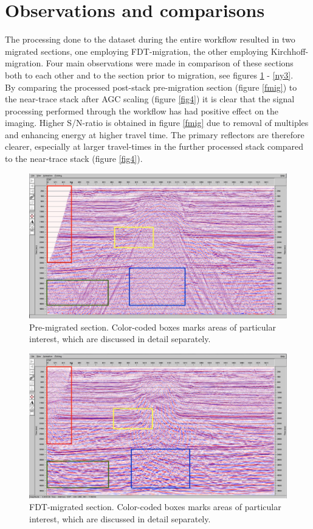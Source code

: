 \documentclass[10pt,a4paper]{article}
\begin{document}
\section{Observations and comparisons}

The processing done to the dataset during the entire workflow resulted in two migrated sections, one employing FDT-migration, the other employing Kirchhoff-migration. Four main observations were made in comparison of these sections both to each other and to the section prior to migration, see figures \ref{ny1} - \ref{ny3}.
\\
By comparing the processed post-stack pre-migration section (figure \ref{fmig}) to the near-trace stack after AGC scaling (figure \ref{fig4}) it is clear that the signal processing performed through the workflow has had positive effect on the imaging. Higher S/N-ratio is obtained in figure \ref{fmig} due to removal of multiples and enhancing energy at higher travel time. The primary reflectors are therefore clearer, especially at larger travel-times in the further processed stack compared to the near-trace stack (figure \ref{fig4}).

\begin{figure}[H]
\includegraphics[width=\textwidth]{ny1.jpg}
\caption{Pre-migrated section. Color-coded boxes marks areas of particular interest, which are discussed in detail separately.}
\label{ny1}
\end{figure}

\begin{figure}[H]
\includegraphics[width=\textwidth]{ny2.jpg}
\caption{FDT-migrated section. Color-coded boxes marks areas of particular interest, which are discussed in detail separately.}
\label{ny2}
\end{figure}
\end{document}
